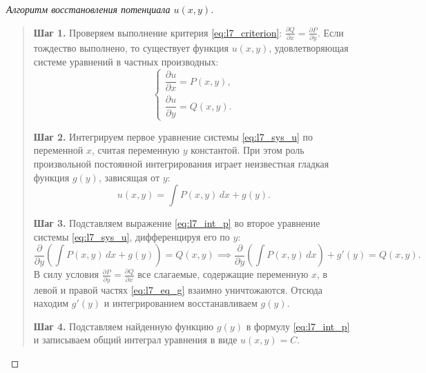 \begin{proof}[Алгоритм восстановления потенциала $u(x, y)$]~\\
    \begin{quote}
        \textbf{Шаг 1.} Проверяем выполнение критерия \eqref{eq:l7_criterion}:
        $\frac{\partial Q}{\partial x} = \frac{\partial P}{\partial y}$. Если
        тождество выполнено, то существует функция $u(x, y)$, удовлетворяющая
        системе уравнений в частных производных:
        \begin{equation} \label{eq:l7_sys_u}
            \begin{cases}
                \dfrac{\partial u}{\partial x} = P(x, y), \\[2mm]
                \dfrac{\partial u}{\partial y} = Q(x, y).
            \end{cases} \tag{9}
        \end{equation}

        \textbf{Шаг 2.} Интегрируем первое уравнение системы \eqref{eq:l7_sys_u}
        по переменной $x$, считая переменную $y$ константой. При этом роль
        произвольной постоянной интегрирования играет неизвестная гладкая
        функция $g(y)$, зависящая от $y$:
        \begin{equation} \label{eq:l7_int_p}
            u(x, y) = \int P(x, y) \, dx + g(y). \tag{10}
        \end{equation}

        \textbf{Шаг 3.} Подставляем выражение \eqref{eq:l7_int_p} во второе
        уравнение системы \eqref{eq:l7_sys_u}, дифференцируя его по $y$:
        \begin{equation} \label{eq:l7_eq_g}
            \frac{\partial}{\partial y} \left(\int P(x, y) \, dx + g(y)\right)
            = Q(x, y) \implies
            \frac{\partial}{\partial y} \left(\int P(x, y) \, dx\right) + g'(y)
            = Q(x, y). \tag{11}
        \end{equation}
        В силу условия $\frac{\partial P}{\partial y} = \frac{\partial Q}{\partial x}$
        все слагаемые, содержащие переменную $x$, в левой и правой частях
        \eqref{eq:l7_eq_g} взаимно уничтожаются. Отсюда находим $g'(y)$ и
        интегрированием восстанавливаем $g(y)$.

        \textbf{Шаг 4.} Подставляем найденную функцию $g(y)$ в формулу
        \eqref{eq:l7_int_p} и записываем общий интеграл уравнения в виде
        $u(x, y) = C$.
    \end{quote}
\end{proof}

